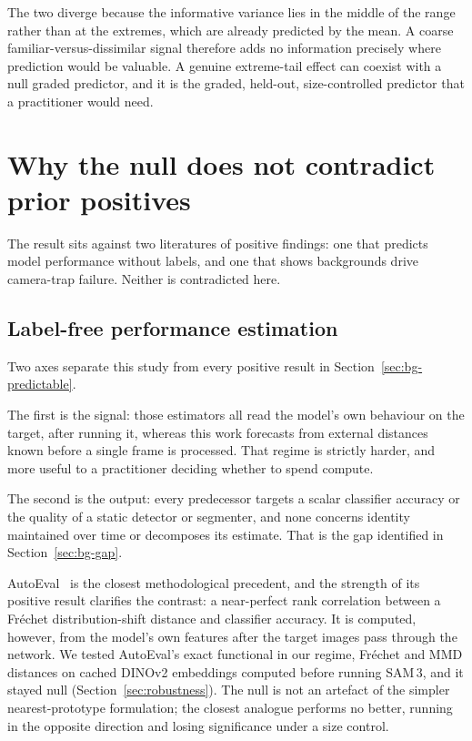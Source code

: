 The two diverge because the informative variance lies in the middle of the range rather than at the
extremes, which are already predicted by the mean. A coarse familiar-versus-dissimilar signal therefore adds
no information precisely where prediction would be valuable. A genuine extreme-tail effect can coexist with a null graded predictor, and it is the graded,
held-out, size-controlled predictor that a practitioner would need.

\section{Why the null does not contradict prior positives}
\label{sec:disc-related}
The result sits against two literatures of positive findings: one that predicts model performance without
labels, and one that shows backgrounds drive camera-trap failure. Neither is contradicted here.

\subsection{Label-free performance estimation}
Two axes separate this study from every positive result in Section~\ref{sec:bg-predictable}.

The first is the signal: those estimators all read the model's own behaviour on the target, after running
it, whereas this work forecasts from external distances known before a single frame is processed. That
regime is strictly harder, and more useful to a practitioner deciding whether to spend compute.

The second is the output: every predecessor targets a scalar classifier accuracy or the quality of a static
detector or segmenter, and none concerns identity maintained over time or decomposes its estimate. That is
the gap identified in Section~\ref{sec:bg-gap}.

AutoEval~\cite{autoeval} is the closest methodological precedent, and the strength of its positive result
clarifies the contrast: a near-perfect rank correlation between a Fr\'echet distribution-shift distance and
classifier accuracy. It is computed, however, from the model's own features after the target images pass
through the network. We tested AutoEval's exact functional in our regime, Fr\'echet and MMD distances
on cached DINOv2 embeddings computed before running SAM\,3, and it stayed null
(Section~\ref{sec:robustness}). The null is not an artefact of the simpler nearest-prototype formulation; the
closest analogue performs no better, running in the opposite direction and losing significance under a size
control.

